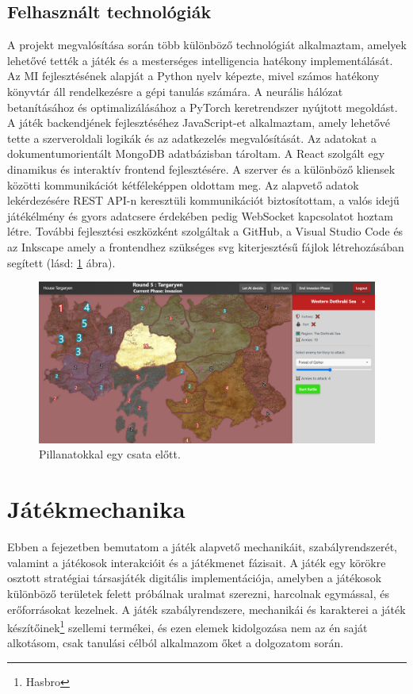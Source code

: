 \documentclass[
]{thesis-ekf}
\theoremstyle{definition}
\theoremstyle{remark}
\begin{document}
	\section{Felhasznált technológiák}
	
	A projekt megvalósítása során több különböző technológiát alkalmaztam, amelyek lehetővé tették a játék és a mesterséges intelligencia hatékony implementálását. Az MI fejlesztésének alapját a Python nyelv képezte, mivel számos hatékony könyvtár áll rendelkezésre a gépi tanulás számára. A neurális hálózat betanításához és optimalizálásához a PyTorch keretrendszer nyújtott megoldást. A játék backendjének fejlesztéséhez JavaScript-et alkalmaztam, amely lehetővé tette a szerveroldali logikák és az adatkezelés megvalósítását. Az adatokat a dokumentumorientált MongoDB adatbázisban tároltam. A React szolgált egy dinamikus és interaktív frontend fejlesztésére. A szerver és a különböző kliensek közötti kommunikációt kétféleképpen oldottam meg. Az alapvető adatok lekérdezésére REST API-n keresztüli kommunikációt biztosítottam, a valós idejű játékélmény és gyors adatcsere érdekében pedig WebSocket kapcsolatot hoztam létre. További fejlesztési eszközként szolgáltak a GitHub, a Visual Studio Code és az Inkscape amely a frontendhez szükséges svg kiterjesztésű fájlok létrehozásában segített (lásd: \ref{invasion-phase} ábra).
	
	\begin{figure}[ht!]
		\centering
		\includegraphics[width=15cm]{InvasionPhase.png}
		\caption{Pillanatokkal egy csata előtt.}
		\label{invasion-phase}
	\end{figure}
	
	\chapter{Játékmechanika}
	
	Ebben a fejezetben bemutatom a játék alapvető mechanikáit, szabályrendszerét, valamint a játékosok interakcióit és a játékmenet fázisait. A játék egy körökre osztott stratégiai társasjáték digitális implementációja, amelyben a játékosok különböző területek felett próbálnak uralmat szerezni, harcolnak egymással, és erőforrásokat kezelnek. A játék szabályrendszere, mechanikái és karakterei a játék készítőinek\footnote{Hasbro} szellemi termékei, és ezen elemek kidolgozása nem az én saját alkotásom, csak tanulási célból alkalmazom őket a dolgozatom során.
	
\end{document}
